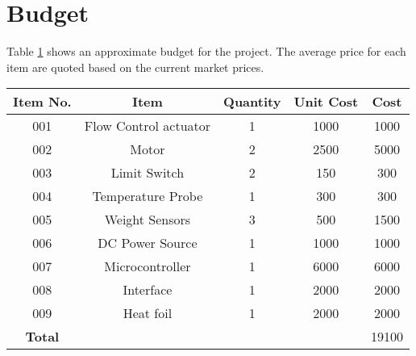 \section{Budget}

Table \ref{tab:budget} shows an approximate budget for the project. The average price for each item are quoted based on the current market prices.

\begin{table}[ht]
  \begin{center}
    \leavevmode
     \begin{tabular}{|c | c | c | c | c |}\hline
      \textbf{Item No.} &  \textbf{Item} & \textbf{Quantity} & \textbf{Unit Cost} & \textbf{Cost} \\
     \hline
     001 & Flow Control actuator & 1 & 1000 &  1000 \\
     \hline
     002 & Motor & 2 & 2500 &  5000 \\
     \hline
     003 & Limit Switch & 2 & 150 &  300 \\
     \hline
     004 & Temperature Probe & 1 & 300 &  300 \\
     \hline
     005 & Weight Sensors & 3 & 500 & 1500 \\
     \hline
     006 & DC Power Source & 1 & 1000 &  1000 \\
     \hline
     007 & Microcontroller &  1 & 6000 & 6000 \\
     \hline
     008 & Interface  & 1 & 2000  & 2000 \\
     \hline
     009 & Heat foil & 1 & 2000 & 2000 \\
     \hline
     \textbf{Total} & & & & 19100 \\
     \hline
    \end{tabular}
    \label{table:1}
  \end{center}
  \label{tab:budget}
\end{table}
